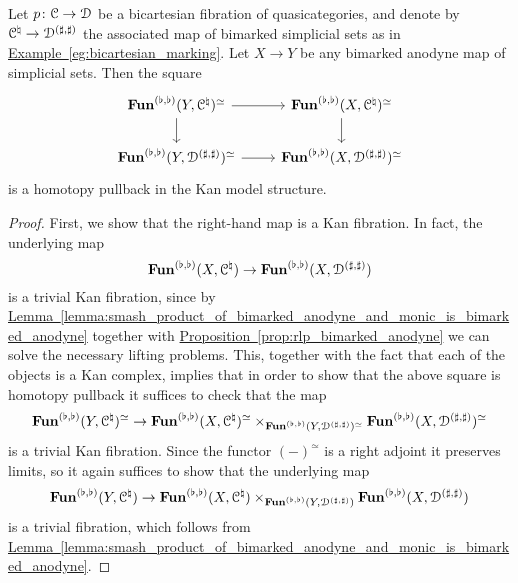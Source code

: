 \documentclass[main.tex]{subfiles}
\begin{document}
\begin{proposition}
  \label{proposition:bimarked_anodyne_homotopy_pullback}
  Let $p\colon \mathcal{C} \to \mathcal{D}$ be a bicartesian fibration of quasicategories, and denote by $\mathcal{C}^{\natural} \to \mathcal{D}^{(\sharp, \sharp)}$ the associated map of bimarked simplicial sets as in \hyperref[eg:bicartesian_marking]{Example~\ref*{eg:bicartesian_marking}}. Let $X \to Y$ be any bimarked anodyne map of simplicial sets. Then the square
  \begin{equation*}
    \begin{tikzcd}
      \Fun^{(\flat, \flat)}(Y, \category{C}\nat)^{\simeq}
      \arrow[r]
      \arrow[d]
      & \Fun^{(\flat, \flat)}(X, \category{C}\nat)^{\simeq}
      \arrow[d]
      \\
      \Fun^{(\flat, \flat)}(Y, \category{D}^{(\sharp, \sharp)})^{\simeq}
      \arrow[r]
      & \Fun^{(\flat, \flat)}(X, \category{D}^{(\sharp, \sharp)})^{\simeq}
    \end{tikzcd}
  \end{equation*}
  is a homotopy pullback in the Kan model structure.
\end{proposition}
\begin{proof}
  First, we show that the right-hand map is a Kan fibration. In fact, the underlying map 
  \begin{equation*}
    \mathbf{Fun}^{(\flat, \flat)}(X, \mathcal{C}^{\natural}) \to \mathbf{Fun}^{(\flat, \flat)}(X, \mathcal{D}^{(\sharp, \sharp)})
  \end{equation*}
  is a trivial Kan fibration, since by \hyperref[lemma:smash_product_of_bimarked_anodyne_and_monic_is_bimarked_anodyne]{Lemma~\ref*{lemma:smash_product_of_bimarked_anodyne_and_monic_is_bimarked_anodyne}} together with \hyperref[prop:rlp_bimarked_anodyne]{Proposition~\ref*{prop:rlp_bimarked_anodyne}} we can solve the necessary lifting problems. This, together with the fact that each of the objects is a Kan complex, implies that in order to show that the above square is homotopy pullback it suffices to check that the map
  \begin{equation*}
    \mathbf{Fun}^{(\flat, \flat)}(Y, \mathcal{C}^{\natural})^{\simeq} \to \mathbf{Fun}^{(\flat, \flat)}(X, \mathcal{C}^{\natural})^{\simeq} \times_{\mathbf{Fun}^{(\flat, \flat)}(Y, \mathcal{D}^{(\sharp, \sharp)})^{\simeq}} \mathbf{Fun}^{(\flat, \flat)}(X, \mathcal{D}^{(\sharp, \sharp)})^{\simeq}
  \end{equation*}
  is a trivial Kan fibration. Since the functor $(-)^{\simeq}$ is a right adjoint it preserves limits, so it again suffices to show that the underlying map
  \begin{equation*}
    \mathbf{Fun}^{(\flat, \flat)}(Y, \mathcal{C}^{\natural}) \to \mathbf{Fun}^{(\flat, \flat)}(X, \mathcal{C}^{\natural}) \times_{\mathbf{Fun}^{(\flat, \flat)}(Y, \mathcal{D}^{(\sharp, \sharp)})} \mathbf{Fun}^{(\flat, \flat)}(X, \mathcal{D}^{(\sharp, \sharp)})
  \end{equation*}
  is a trivial fibration, which follows from \hyperref[lemma:smash_product_of_bimarked_anodyne_and_monic_is_bimarked_anodyne]{Lemma~\ref*{lemma:smash_product_of_bimarked_anodyne_and_monic_is_bimarked_anodyne}}.
\end{proof}
\end{document}
